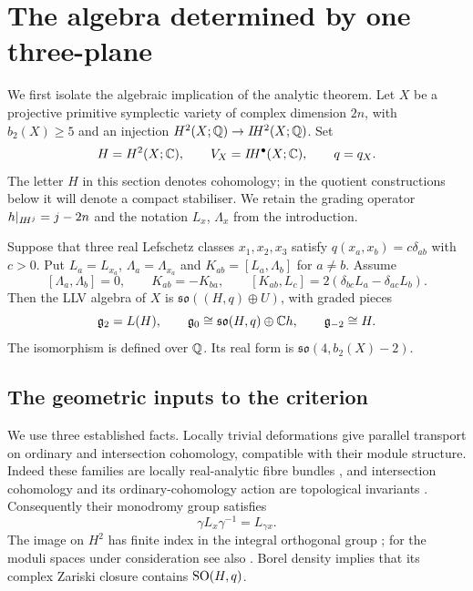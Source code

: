 \section{The algebra determined by one three-plane}\label{sec:algebra}

We first isolate the algebraic implication of the analytic theorem.
Let $X$ be a projective primitive symplectic variety of complex
dimension $2n$, with $b_2(X)\ge5$ and an injection
$H^2(X;\mathbb Q)\to I\!H^2(X;\mathbb Q)$. Set
\[
 H=H^2(X;\mathbb C),\qquad V_X=I\!H^\bullet(X;\mathbb C),\qquad q=q_X.
\]
The letter $H$ in this section denotes cohomology; in the quotient
constructions below it will denote a compact stabiliser. We retain
the grading operator $h|_{I\!H^j}=j-2n$ and the notation $L_x$,
$\Lambda_x$ from the introduction.

\begin{theorem}\label{thm:criterion}
Suppose that three real Lefschetz classes $x_1,x_2,x_3$ satisfy
$q(x_a,x_b)=c\delta_{ab}$ with $c>0$. Put
$L_a=L_{x_a}$, $\Lambda_a=\Lambda_{x_a}$ and
$K_{ab}=[L_a,\Lambda_b]$ for $a\ne b$. Assume
\begin{equation}\label{eq:V}
 [\Lambda_a,\Lambda_b]=0,\qquad K_{ab}=-K_{ba},\qquad
 [K_{ab},L_c]=2(\delta_{bc}L_a-\delta_{ac}L_b).
\end{equation}
Then the LLV algebra of $X$ is
$\mathfrak{so}((H,q)\oplus U)$, with graded pieces
\[
 \mathfrak g_2=L(H),\qquad
 \mathfrak g_0\cong\mathfrak{so}(H,q)\oplus\mathbb C h,
 \qquad \mathfrak g_{-2}\cong H.
\]
The isomorphism is defined over $\mathbb Q$. Its real form is
$\mathfrak{so}(4,b_2(X)-2)$.
\end{theorem}

\subsection{The geometric inputs to the criterion}
We use three established facts. Locally trivial deformations give
parallel transport on ordinary and intersection cohomology, compatible
with their module structure. Indeed these families are locally
real-analytic fibre bundles \cite[Proposition~5.1]{av21}, and
intersection cohomology and its ordinary-cohomology action are
topological invariants \cite{gm83}. Consequently their monodromy
group satisfies
\begin{equation}\label{eq:mon}
 \gamma L_x\gamma^{-1}=L_{\gamma x}.
\end{equation}
The image on $H^2$ has finite index in the integral orthogonal group
\cite[Theorem~1.1]{bl22}; for the moduli spaces under consideration
see also \cite{opr24}. Borel density implies that its complex Zariski
closure contains $\operatorname{SO}(H,q)$.

